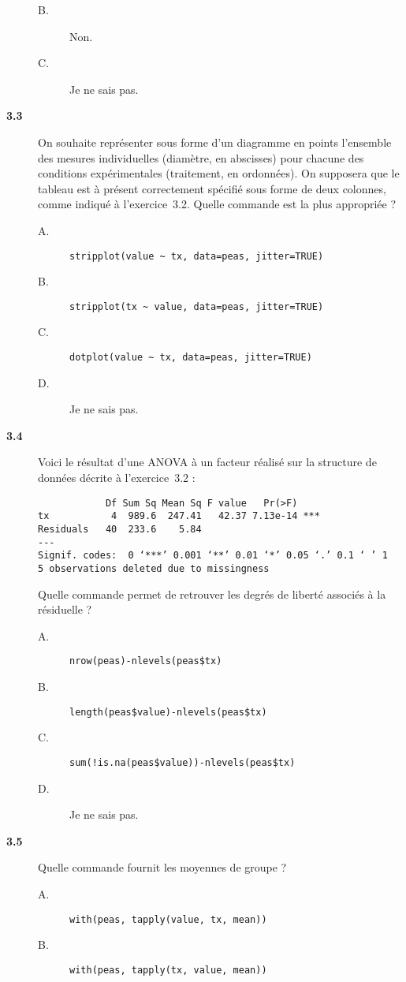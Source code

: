 \documentclass[11pt]{report}
\theoremstyle{definition}
\begin{document}
\begin{description}
\begin{description}
  \item[B.] Non.
  \item[C.] Je ne sais pas.
  \end{description}  
\item[\bf 3.3]  On souhaite représenter sous forme
  d'un diagramme en points l'ensemble des mesures individuelles (diamètre,
  en abscisses) pour chacune des conditions expérimentales (traitement, en
  ordonnées). On supposera que le tableau est à présent correctement
  spécifié sous forme de deux colonnes, comme indiqué à
  l'exercice~3.2. Quelle commande est la plus appropriée ?
  \begin{description}
  \item[A.] \verb|stripplot(value ~ tx, data=peas, jitter=TRUE)|
  \item[B.] \verb|stripplot(tx ~ value, data=peas, jitter=TRUE)|
  \item[C.] \verb|dotplot(value ~ tx, data=peas, jitter=TRUE)|
  \item[D.] Je ne sais pas.
  \end{description}
\item[\bf 3.4]  Voici le résultat d'une ANOVA à un
  facteur réalisé sur la structure de données décrite à l'exercice~3.2 :
\begin{verbatim}
            Df Sum Sq Mean Sq F value   Pr(>F)    
tx           4  989.6  247.41   42.37 7.13e-14 ***
Residuals   40  233.6    5.84                     
---
Signif. codes:  0 ‘***’ 0.001 ‘**’ 0.01 ‘*’ 0.05 ‘.’ 0.1 ‘ ’ 1 
5 observations deleted due to missingness
\end{verbatim}
  Quelle commande permet de retrouver les degrés de liberté associés à la
  résiduelle ? 
  \begin{description}
  \item[A.] \verb|nrow(peas)-nlevels(peas$tx)|
  \item[B.] \verb|length(peas$value)-nlevels(peas$tx)|
  \item[C.] \verb|sum(!is.na(peas$value))-nlevels(peas$tx)|
  \item[D.] Je ne sais pas.
  \end{description}  
\item[\bf 3.5]  Quelle commande fournit les
  moyennes de groupe ?
  \begin{description}
  \item[A.] \verb|with(peas, tapply(value, tx, mean))|
  \item[B.] \verb|with(peas, tapply(tx, value, mean))|

\end{description}
\end{description}
\end{document}
